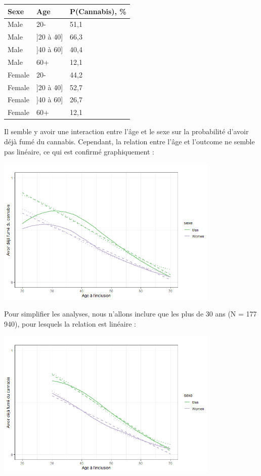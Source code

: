 \documentclass[
]{book}
\begin{document}
\begin{table}
\centering
\begin{tabular}[t]{l|l|l}
\hline
Sexe & Age & P(Cannabis), \%\\
\hline
Male & 20- & 51,1\\
\hline
Male & ]20 à 40] & 66,3\\
\hline
Male & ]40 à 60] & 40,4\\
\hline
Male & 60+ & 12,1\\
\hline
Female & 20- & 44,2\\
\hline
Female & ]20 à 40] & 52,7\\
\hline
Female & ]40 à 60] & 26,7\\
\hline
Female & 60+ & 12,1\\
\hline
\end{tabular}
\end{table}

Il semble y avoir une interaction entre l'âge et le sexe sur la probabilité d'avoir déjà fumé du cannabis. Cependant, la relation entre l'âge et l'outcome ne semble pas linéaire, ce qui est confirmé graphiquement :

\includegraphics[width=0.8\textwidth,height=\textheight]{img/graph_Xquanti_1.png}

Pour simplifier les analyses, nous n'allons inclure que les plus de 30 ans (N = 177 940), pour lesquels la relation est linéaire :

\includegraphics[width=0.8\textwidth,height=\textheight]{img/graph_Xquanti_2.png}
\end{document}
